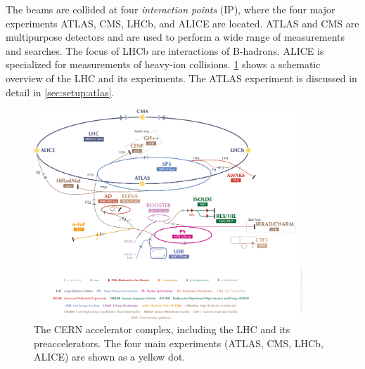 The beams are collided at four \emph{interaction points} (IP), where the four major experiments ATLAS, CMS, LHCb, and ALICE
are located.
ATLAS and CMS are multipurpose detectors and are used to perform a wide range of measurements and searches.
The focus of LHCb are interactions of B-hadrons.
ALICE is specialized for measurements of heavy-ion collisions.
\cref{fig:setup:accelerators} shows a schematic overview of the LHC and its experiments.
The ATLAS experiment is discussed in detail in \cref{sec:setup:atlas}.
\begin{figure}[htb]
    \centering
    \includegraphics[width=0.9\textwidth]{./figures/setup/accelerators.png}
    \caption{The CERN accelerator complex, including the LHC and its preaccelerators.
             The four main experiments (ATLAS, CMS, LHCb, ALICE) are shown as a yellow dot.~\cite{Mobs:2197559}}\label{fig:setup:accelerators}
\end{figure}

